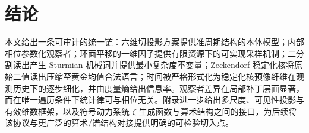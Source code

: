\section{结论}

本文给出一条可审计的统一链：六维切投影方案提供准周期结构的本体模型；内部相位参数化观察者；环面平移的一维因子提供有限资源下的可实现采样机制；二分割读出产生 Sturmian 机械词并提供最小复杂度不变量；Zeckendorf 稳定化核将原始二值读出压缩至黄金均值合法语言；时间被严格形式化为稳定化核预像纤维在观测历史下的逐步细化，并由度量熵给出信息率。观察者差异在局部补丁层面显著，而在唯一遍历条件下统计律可与相位无关。附录进一步给出多尺度、可见性投影与有效维数框架，以及符号动力系统 $\zeta$ 生成函数与算术结构之间的接口，为后续将该协议与更广泛的算术/谱结构对接提供明确的可检验切入点。

